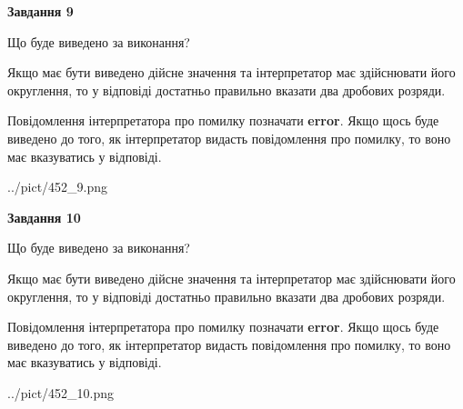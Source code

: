 \documentclass[12pt, ukrainian]{article}
\begin{document}
{\begin {Large}
{\begin {center}\textbf{Завдання 9}\end {center}}\par
Що буде виведено за виконання? \par

Якщо має бути виведено дійсне значення та інтерпретатор має здійснювати його округлення, 
то у відповіді достатньо правильно вказати два дробових розряди.

Повідомлення інтерпретатора про помилку позначати \textbf{error}.
Якщо щось буде виведено до того, як інтерпретатор видасть повідомлення про помилку, 
то воно має вказуватись у відповіді. \par

\begin{center}
	{../pict/452_9.png}
\end{center}
\newpage

{\begin {center}\textbf{Завдання 10}\end {center}}\par
Що буде виведено за виконання? \par

Якщо має бути виведено дійсне значення та інтерпретатор має здійснювати його округлення, 
то у відповіді достатньо правильно вказати два дробових розряди.

Повідомлення інтерпретатора про помилку позначати \textbf{error}.
Якщо щось буде виведено до того, як інтерпретатор видасть повідомлення про помилку, 
то воно має вказуватись у відповіді. \par

\begin{center}
	{../pict/452_10.png}
\end{center}
\newpage

\end {Large}}
\end{document}

